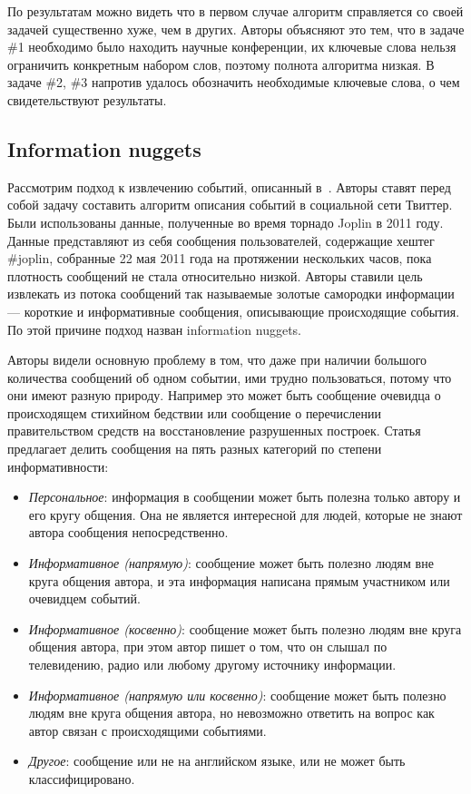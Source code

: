 \documentclass[12pt, a4paper]{article}
\begin{document}
	По результатам можно видеть что в первом случае алгоритм справляется со своей задачей существенно хуже, чем в других. Авторы объясняют это тем, что в задаче \#1 необходимо было находить научные конференции, их ключевые слова нельзя ограничить конкретным набором слов, поэтому полнота алгоритма низкая. В задаче \#2, \#3 напротив удалось обозначить необходимые ключевые слова, о чем свидетельствуют результаты.
	
	\subsection{Information nuggets}
	Рассмотрим подход к извлечению событий, описанный в~\cite{nuggets}. Авторы ставят перед собой задачу составить алгоритм описания событий в социальной сети Твиттер. Были использованы данные, полученные во время торнадо Joplin в 2011 году. Данные представляют из себя сообщения пользователей, содержащие хештег \#joplin, собранные 22 мая 2011 года на протяжении нескольких часов, пока плотность сообщений не стала относительно низкой. Авторы ставили цель извлекать из потока сообщений так называемые золотые самородки информации --- короткие и информативные сообщения, описывающие происходящие события. По этой причине подход назван information nuggets.
	
	Авторы видели основную проблему в том, что даже при наличии большого количества сообщений об одном событии, ими трудно пользоваться, потому что они имеют разную природу. Например это может быть сообщение очевидца о происходящем стихийном бедствии или сообщение о перечислении правительством средств на восстановление разрушенных построек. Статья предлагает делить сообщения на пять разных категорий по степени информативности:
	\begin{itemize}
	\item\emph{Персональное}:
	информация в сообщении может быть полезна только автору и его кругу общения. Она не является интересной для людей, которые не знают автора сообщения непосредственно.
	\item\emph{Информативное (напрямую)}:
	сообщение может быть полезно людям вне круга общения автора, и эта информация написана прямым участником или очевидцем событий.
	\item\emph{Информативное (косвенно)}:
	сообщение может быть полезно людям вне круга общения автора, при этом автор пишет о том, что он слышал по телевидению, радио или любому другому источнику информации.
	\item\emph{Информативное (напрямую или косвенно)}:
	сообщение может быть полезно людям вне круга общения автора, но невозможно ответить на вопрос как автор связан с происходящими событиями.
	\item\emph{Другое}:
	сообщение или не на английском языке, или не может быть классифицировано.
	\end{itemize}
	
\end{document}
